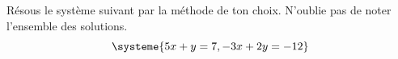 %
%
    Résous le système suivant par la méthode de ton choix. N'oublie pas de noter l'ensemble des solutions.
    \[\systeme{5x+y=7, -3x+2y=-12}\]
